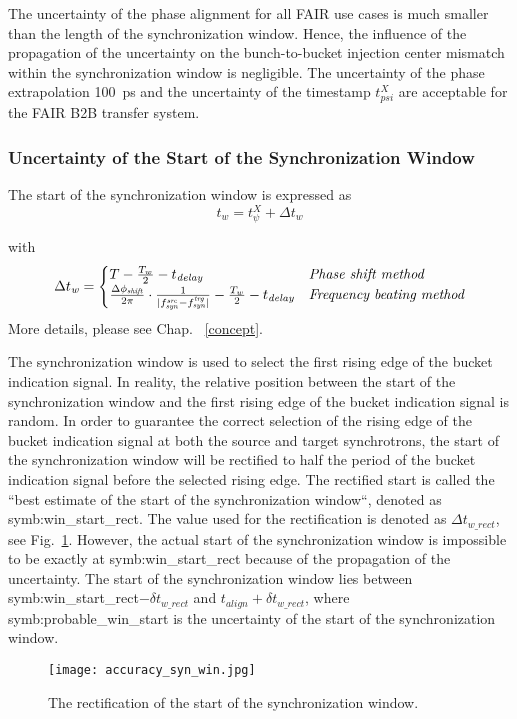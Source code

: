 \begin{itemize}
The uncertainty of the phase alignment for all FAIR use cases is much smaller than the length of the synchronization window. Hence, the influence of the propagation of the uncertainty on the bunch-to-bucket injection center mismatch within the synchronization window is negligible. The uncertainty of the phase extrapolation \SI{100}{ps} and the uncertainty of the timestamp $t_\mathit{psi}^X$ are acceptable for the FAIR B2B transfer system.

\end{itemize}

\subsubsection{Uncertainty of the Start of the Synchronization Window}
The start of the synchronization window is expressed as 
\begin{equation}
t_\mathit{w}=t_\psi^\mathit{X}+\Delta t_\mathit{w}\label{syn_win_start2}
\end{equation}

with 
\begin{eqnarray}
\Delta t_\mathit{w}=
\begin{cases}
T-\frac{T_w}{2}-t_\mathit{delay} &\textit{Phase shift method}\cr
\frac{\Delta \phi_\mathit{shift}}{2\pi}\cdot\frac{1}{|f_{\mathit{syn}}^\mathit{src}-f_{\mathit{syn}}^\mathit{trg}|}-\frac{T_w}{2}-t_\mathit{delay} & \textit{Frequency beating method}\cr
\end{cases}
\end{eqnarray}
More details, please see Chap. ~\ref{concept}.

The synchronization window is used to select the first rising edge of the bucket indication signal. In reality, the relative position between the start of the synchronization window and the first rising edge of the bucket indication signal is random. In order to guarantee the correct selection of the rising edge of the bucket indication signal at both the source and target synchrotrons, the start of the synchronization window will be rectified to half the period of the bucket indication signal before the selected rising edge. The rectified start is called the ``best estimate of the start of the synchronization window``, denoted as \gls{symb:win_start_rect}. The value used for the rectification is denoted as $\Delta t_\mathit{w\_rect}$, see Fig.~\ref{accuracy_syn_win}. However, the actual start of the synchronization window is impossible to be exactly at \gls{symb:win_start_rect} because of the propagation of the uncertainty. The start of the synchronization window lies between \gls{symb:win_start_rect}$-\delta t_\mathit{w\_rect}$ and $t_\mathit{align}+\delta t_\mathit{w\_rect}$, where \gls{symb:probable_win_start} is the uncertainty of the start of the synchronization window. 
\begin{figure}[!htb]
   \centering   
   \texttt{[image: accuracy\_syn\_win.jpg]}
   \caption{The rectification of the start of the synchronization window.}
   \label{accuracy_syn_win}
\end{figure}

